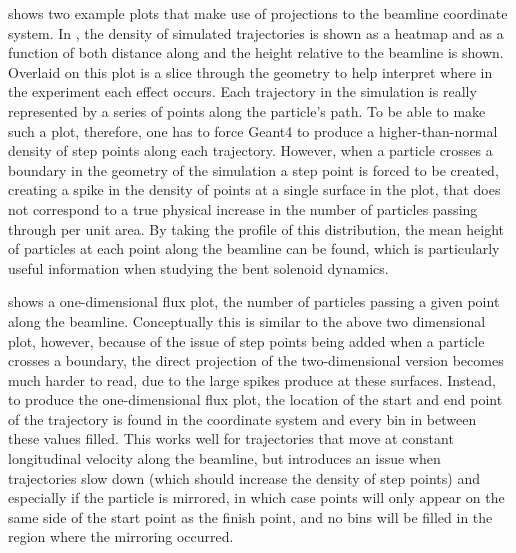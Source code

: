  shows two example plots that make use of projections to the beamline coordinate system.
In , the density of simulated trajectories is shown as a heatmap and as a function of both distance along and the height relative to the beamline is shown.
Overlaid on this plot is a slice through the geometry to help interpret where in the experiment each effect occurs.
Each trajectory in the simulation is really represented by a series of points along the particle's path.
To be able to make such a plot, therefore, one has to force Geant4 to produce a higher-than-normal density of step points along each trajectory.
However, when a particle crosses a boundary in the geometry of the simulation a step point is forced to be created, creating a spike in the density of points at a single surface in the plot, that does not correspond to a true physical increase in the number of particles passing through per unit area.
By taking the profile of this distribution, the mean height of particles at each point along the beamline can be found, which is particularly useful information when studying the bent solenoid dynamics.

 shows a one-dimensional flux plot, \ie the number of particles passing a given point along the beamline.
Conceptually this is similar to the above two dimensional plot, however, because of the issue of step points being added when a particle crosses a boundary, the direct projection of the two-dimensional version becomes much harder to read, due to the large spikes  produce at these surfaces.  
Instead, to produce the one-dimensional flux plot, the location of the start and end point of the trajectory is found in the coordinate system and every bin in between these values filled.
This works well for trajectories that move at constant longitudinal velocity along the beamline, but introduces an issue when trajectories slow down (which should increase the density of step points) and especially if the particle is mirrored, in which case points will only appear on the same side of the start point as the finish point, and no bins will be filled in the region where the mirroring occurred.

